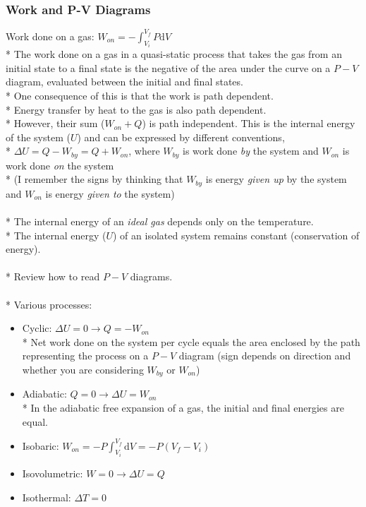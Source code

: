 \subsubsection{Work and P-V Diagrams}
Work done on a gas: \(\displaystyle W_{on}=-\int_{V_{i}}^{V_{f}}P\mathrm{d}V\)\\*
The work done on a gas in a quasi-static process that takes the gas from an initial state to a final state is the negative of the area under the curve on a \(P-V\) diagram, evaluated between the initial and final states.\\*
One consequence of this is that the work is path dependent.\\*
Energy transfer by heat to the gas is also path dependent.\\*
However, their sum (\(W_{on}+Q\)) is path independent. This is the internal energy of the system (\(U\)) and can be expressed by different conventions,\\*
\(\Delta U=Q-W_{by}=Q+W_{on}\), where \(W_{by}\) is work done \emph{by} the system and \(W_{on}\) is work done \emph{on} the system\\*
(I remember the signs by thinking that \(W_{by}\) is energy \emph{given up} by the system and \(W_{on}\) is energy \emph{given to} the system)\\\\*
%
The internal energy of an \emph{ideal gas} depends only on the temperature.\\*
The internal energy (\(U\)) of an isolated system remains constant (conservation of energy).\\\\*
%
Review how to read \(P-V\) diagrams.\\\\*
%
Various processes:
\begin{itemize}
\item Cyclic: \(\Delta U=0\rightarrow Q=-W_{on}\)\\*
Net work done on the system per cycle equals the area enclosed by the path representing the process on a \(P-V\) diagram (sign depends on direction and whether you are considering \(W_{by}\) or \(W_{on}\))
\item Adiabatic: \(Q=0 \rightarrow \Delta U=W_{on}\)\\*
In the adiabatic free expansion of a gas, the initial and final energies are equal.
\item Isobaric: \(W_{on}=-P\int_{V_{i}}^{V_{f}}\mathrm{d}V=-P(V_f-V_i)\)
\item Isovolumetric: \(W=0\rightarrow\Delta U=Q\)
\item Isothermal: \(\Delta T=0\)
\end{itemize}

